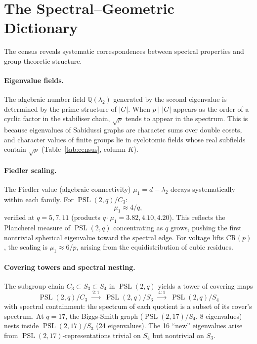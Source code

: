 \documentclass[mlmain]{jmlr}
\newcommand{\PSL}{\operatorname{PSL}}
\newcommand{\Q}{\mathbb{Q}}
\newcommand{\CR}{\mathrm{CR}}
\begin{document}
\section{The Spectral--Geometric Dictionary}
\label{sec:dictionary}

The census reveals systematic correspondences between
spectral properties and group-theoretic structure.

\paragraph{Eigenvalue fields.}
The algebraic number field $\Q(\lambda_2)$ generated by the
second eigenvalue is determined by the prime structure of
$|G|$.  When $p \mid |G|$ appears as the order of a cyclic
factor in the stabiliser chain, $\sqrt{p}$ tends to appear
in the spectrum.  This is because eigenvalues of Sabidussi
graphs are character sums over double cosets, and character
values of finite groups lie in cyclotomic fields whose real
subfields contain $\sqrt{p}$ (Table~\ref{tab:census},
column $K$).

\paragraph{Fiedler scaling.}
The Fiedler value (algebraic connectivity) $\mu_1 = d - \lambda_2$
decays systematically within each family.  For $\PSL(2,q)/C_3$:
\begin{equation}
\label{eq:fiedler}
  \mu_1 \approx 4/q,
\end{equation}
verified at $q = 5, 7, 11$ (products $q \cdot \mu_1 = 3.82, 4.10, 4.20$).
This reflects the Plancherel measure of $\PSL(2,q)$
concentrating as $q$ grows, pushing the first nontrivial
spherical eigenvalue toward the spectral edge.
For voltage lifts $\CR(p)$, the scaling is
$\mu_1 \approx 6/p$, arising from the equidistribution of
cubic residues.

\paragraph{Covering towers and spectral nesting.}
The subgroup chain $C_3 \subset S_3 \subset S_4$ in
$\PSL(2,q)$ yields a tower of covering maps
\begin{equation}
\label{eq:tower}
\PSL(2,q)/C_3
\;\xrightarrow{\ 2:1\ }\;
\PSL(2,q)/S_3
\;\xrightarrow{\ 4:1\ }\;
\PSL(2,q)/S_4
\end{equation}
with spectral containment: the spectrum of each quotient is
a subset of its cover's spectrum.  At $q = 17$, the
Biggs-Smith graph ($\PSL(2,17)/S_4$, 8 eigenvalues) nests
inside $\PSL(2,17)/S_3$ (24 eigenvalues).  The 16 ``new''
eigenvalues arise from $\PSL(2,17)$-representations trivial
on $S_4$ but nontrivial on $S_3$.
\end{document}

